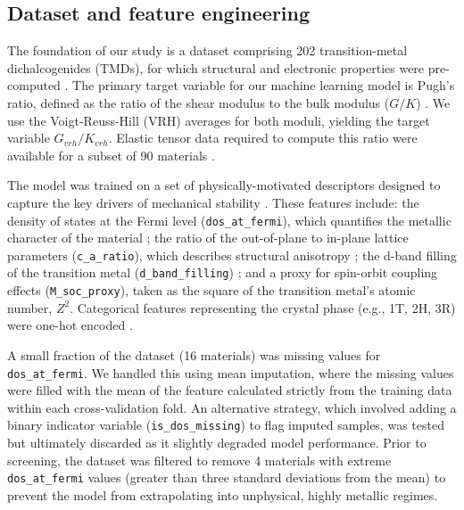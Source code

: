 \documentclass[]{article}
\begin{document}
\subsection{Dataset and feature engineering}
The foundation of our study is a dataset comprising 202 transition-metal dichalcogenides (TMDs), for which structural and electronic properties were pre-computed \citep{muller2023open,Ramanathan_2023,chen2021leveraginglargescalecomputationaldatabase}. The primary target variable for our machine learning model is Pugh's ratio, defined as the ratio of the shear modulus to the bulk modulus ($G/K$) \citep{dejong2018statistical,malakar2022datadrivenmachinelearningpredict,Ali_2024}. We use the Voigt-Reuss-Hill (VRH) averages for both moduli, yielding the target variable $G_{vrh}/K_{vrh}$. Elastic tensor data required to compute this ratio were available for a subset of 90 materials \citep{dejong2018statistical,Choudhary_2020,muller2023open}.

The model was trained on a set of physically-motivated descriptors designed to capture the key drivers of mechanical stability \citep{Pham_2018,tawfik2022naturallymeaningfulefficientdescriptorsmachine,Tawfik_2022,Gajera_2022,Willatt_2018,Mukhamedov_2025,Hasan_2025,Liu_2024}. These features include: the density of states at the Fermi level (\texttt{dos\_at\_fermi}), which quantifies the metallic character of the material \citep{Georgescu_2021}; the ratio of the out-of-plane to in-plane lattice parameters (\texttt{c\_a\_ratio}), which describes structural anisotropy \citep{singh2025linkingquantummechanicalfeatures,Hasan_2025,Liu_2024}; the d-band filling of the transition metal (\texttt{d\_band\_filling}) \citep{Pham_2018,Gajera_2022,Willatt_2018}; and a proxy for spin-orbit coupling effects (\texttt{M\_soc\_proxy}), taken as the square of the transition metal's atomic number, $Z^2$. Categorical features representing the crystal phase (e.g., 1T, 2H, 3R) were one-hot encoded \citep{singh2025linkingquantummechanicalfeatures,Hasan_2025,mizzi2026leveragingmechanicalresonancesselection}.

A small fraction of the dataset (16 materials) was missing values for \texttt{dos\_at\_fermi}. We handled this using mean imputation, where the missing values were filled with the mean of the feature calculated strictly from the training data within each cross-validation fold. An alternative strategy, which involved adding a binary indicator variable (\texttt{is\_dos\_missing}) to flag imputed samples, was tested but ultimately discarded as it slightly degraded model performance. Prior to screening, the dataset was filtered to remove 4 materials with extreme \texttt{dos\_at\_fermi} values (greater than three standard deviations from the mean) to prevent the model from extrapolating into unphysical, highly metallic regimes.
\end{document}
